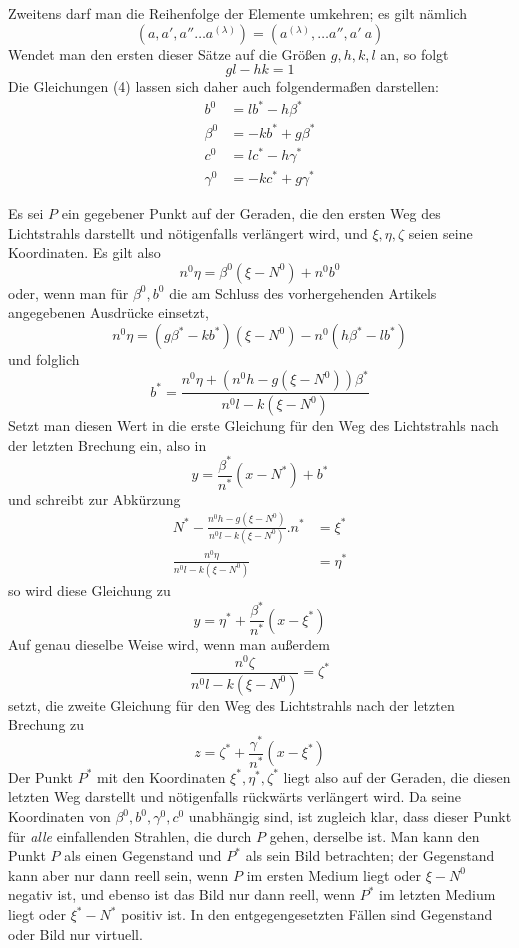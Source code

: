 Zweitens darf man die Reihenfolge der Elemente umkehren; es gilt nämlich
\[
(a,a',a''\ldots a^{(\lambda)})=(a^{(\lambda)},\ldots a'',a'\ a)
\]
Wendet man den ersten dieser Sätze auf die Größen $g,h,k,l$ an, so folgt
\[
gl-hk=1
\]
Die Gleichungen (4) lassen sich daher auch folgendermaßen darstellen:
\[
\begin{aligned}
b^0&=lb^*-h\beta^*\\
\beta^0&=-kb^*+g\beta^*\\
c^0&=lc^*-h\gamma^*\\
\gamma^0&=-kc^*+g\gamma^*
\end{aligned}
\]

Es sei $P$ ein gegebener Punkt auf der Geraden, die den ersten Weg des Lichtstrahls darstellt und nötigenfalls verlängert wird, und $\xi,\eta,\zeta$ seien seine Koordinaten. Es gilt also
\[
n^0\eta=\beta^0(\xi-N^0)+n^0b^0
\]
oder, wenn man für $\beta^0,b^0$ die am Schluss des vorhergehenden Artikels angegebenen Ausdrücke einsetzt,
\[
n^0\eta=(g\beta^*-kb^*)(\xi-N^0)-n^0(h\beta^*-lb^*)
\]
und folglich
\[
b^*=\frac{n^0\eta+(n^0h-g(\xi-N^0))\beta^*}{n^0l-k(\xi-N^0)}
\]
Setzt man diesen Wert in die erste Gleichung für den Weg des Lichtstrahls nach der letzten Brechung ein, also in
\[
y=\frac{\beta^*}{n^*}(x-N^*)+b^*
\]
und schreibt zur Abkürzung
\[
\begin{aligned}
N^*-\frac{n^0h-g(\xi-N^0)}{n^0l-k(\xi-N^0)}.n^*&=\xi^*\\
\frac{n^0\eta}{n^0l-k(\xi-N^0)}&=\eta^*
\end{aligned}
\]
so wird diese Gleichung zu
\[
y=\eta^*+\frac{\beta^*}{n^*}(x-\xi^*)
\]
Auf genau dieselbe Weise wird, wenn man außerdem
\[
\frac{n^0\zeta}{n^0l-k(\xi-N^0)}=\zeta^*
\]
setzt, die zweite Gleichung für den Weg des Lichtstrahls nach der letzten Brechung zu
\[
z=\zeta^*+\frac{\gamma^*}{n^*}(x-\xi^*)
\]
Der Punkt $P^*$ mit den Koordinaten $\xi^*,\eta^*,\zeta^*$ liegt also auf der Geraden, die diesen letzten Weg darstellt und nötigenfalls rückwärts verlängert wird. Da seine Koordinaten von $\beta^0,b^0,\gamma^0,c^0$ unabhängig sind, ist zugleich klar, dass dieser Punkt für \textit{alle} einfallenden Strahlen, die durch $P$ gehen, derselbe ist. Man kann den Punkt $P$ als einen Gegenstand und $P^*$ als sein Bild betrachten; der Gegenstand kann aber nur dann reell sein, wenn $P$ im ersten Medium liegt oder $\xi-N^0$ negativ ist, und ebenso ist das Bild nur dann reell, wenn $P^*$ im letzten Medium liegt oder $\xi^*-N^*$ positiv ist. In den entgegengesetzten Fällen sind Gegenstand oder Bild nur virtuell.

